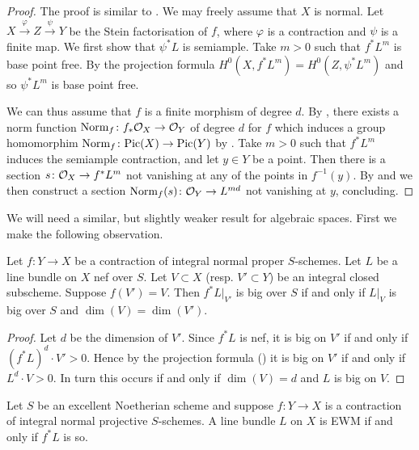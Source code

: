 	\begin{proof}
	The proof is similar to \cite[Lemma 2.10]{Keel}.	
	We may freely assume that $X$ is normal. 
	Let $X \xrightarrow{\varphi} Z \xrightarrow{\psi} Y$ be the Stein factorisation of $f$, where $\varphi$ is a contraction and $\psi$ is a finite map. 
	We first show that $\psi^*L$ is semiample. Take $m>0$ such that $f^*L^{ m}$ is base point free. By the projection formula $H^0(X, f^*L^{m})=H^0(Z, \psi^*L^{m})$ and so $\psi^*L^{m}$ is base point free.
	
	We can thus assume that $f$ is a finite morphism of degree $d$.
	By , there exists a norm function $\textup{Norm}_f \colon f_*\mathcal{O}_X \to \mathcal{O}_Y$ of degree $d$ for $f$ which induces a group homomorphim $\textup{Norm}_f \colon \text{Pic}(X) \to \text{Pic}(Y)$ by . Take $m>0$ such that $f^*L^{m}$ induces the semiample contraction, and let $y\in Y$ be a point. Then there is a section $s\colon \mathcal{O}_X\to f^*L^{m}$ not vanishing at any of the points in $f^{-1}(y)$. By  and  we then construct a section $\textup{Norm}_f(s)\colon \mathcal{O}_{Y}\to L^{md}$ not vanishing at $y$, concluding.
	
\end{proof}

	We will need a similar, but slightly weaker result for algebraic spaces. First we make the following observation.

	\begin{lemma}\label{com-big}
	Let $f \colon Y \to X$ be a contraction of integral normal proper $S$-schemes. Let $L$ be a line bundle on $X$ nef over $S$. Let $V \subset X$ (resp. $V' \subset Y$) be an integral closed subscheme.
	Suppose $f(V')=V$. Then $f^{*}L|_{V'}$ is big over $S$ if and only if $L|_V$ is big over $S$ and $\dim (V)=\dim (V')$.  
	\end{lemma}

	\begin{proof}
	
	Let $d$ be the dimension of $V'$. Since $f^{*}L$ is nef, it is big on $V'$ if and only if $(f^{*}L)^{d} \cdot V'>0$.
	Hence by the projection formula (\cite[Proposition VI.2.11]{k-rat-curves}) it is big on $V'$ if and only if $L^{d} \cdot V> 0$. In turn this occurs if and only if $\dim (V) =d$ and $L$ is big on $V$.
\end{proof}

\begin{lemma}\label{pp-EWM}
	Let $S$ be an excellent Noetherian scheme and suppose $f \colon Y\to X$ is a contraction of integral normal projective $S$-schemes.
	A line bundle $L$ on $X$ is EWM if and only if $f^{*}L$ is so.	
\end{lemma}

